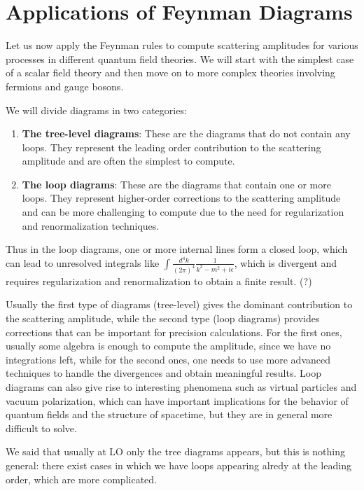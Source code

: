\section{Applications of Feynman Diagrams}

Let us now apply the Feynman rules to compute scattering amplitudes for various processes in different quantum field theories. We will start with the simplest case of a scalar field theory and then move on to more complex theories involving fermions and gauge bosons.

We will divide diagrams in two categories:
\begin{enumerate}
    \item \textbf{The tree-level diagrams}: These are the diagrams that do not contain any loops. They represent the leading order contribution to the scattering amplitude and are often the simplest to compute.
    \item \textbf{The loop diagrams}: These are the diagrams that contain one or more loops. They represent higher-order corrections to the scattering amplitude and can be more challenging to compute due to the need for regularization and renormalization techniques.
\end{enumerate}
Thus in the loop diagrams, one or more internal lines form a closed loop, which can lead to unresolved integrals like \(\int \frac{d^4 k}{(2\pi)^4} \frac{1}{k^2 - m^2 + i\epsilon}\), which is divergent and requires regularization and renormalization to obtain a finite result. (?)

Usually the first type of diagrams (tree-level) gives the dominant contribution to the scattering amplitude, while the second type (loop diagrams) provides corrections that can be important for precision calculations. For the first ones, usually some algebra is enough to compute the amplitude, since we have no integrations left, while for the second ones, one needs to use more advanced techniques to handle the divergences and obtain meaningful results. Loop diagrams can also give rise to interesting phenomena such as virtual particles and vacuum polarization, which can have important implications for the behavior of quantum fields and the structure of spacetime, but they are in general more difficult to solve.

\begin{remark}
    We said that usually at LO only the tree diagrams appears, but this is nothing general: there exist cases in which we have loops appearing alredy at the leading order, which are more complicated.
\end{remark}

